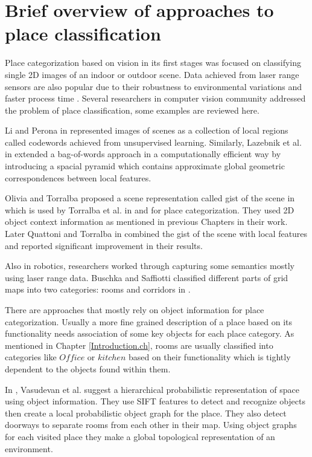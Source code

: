 \section{Brief overview of approaches to place classification}
\label{OverviewPlaceClassification.sec}
 Place categorization based on vision in its first stages was focused on classifying single 2D images of an indoor or 
 outdoor scene.
 Data achieved from laser range sensors are also popular due to their robustness to environmental variations and faster process time
 \cite{pronobis2011phd}.
 Several researchers in computer vision community addressed the problem of place classification, some examples are 
 reviewed here.
 
 Li and Perona in \cite{Li:2005:BHM:1068508.1069129} represented images of scenes as a collection of local regions 
 called codewords achieved from unsupervised learning. 
 Similarly, Lazebnik et al. in \cite{1641019} extended a bag-of-words approach in a computationally efficient way
 by introducing a spacial pyramid which contains approximate global geometric correspondences between local features.
  
 Olivia and Torralba proposed a scene representation called gist of the scene in \cite{oliva2006building} which is 
 used by Torralba et al. in \cite{TorralbaContextualPriming} and \cite{TrollbaContexBased} for place categorization.
 They used 2D object context information as mentioned in previous Chapters in their work.
 Later Quattoni and Torralba in \cite{quattoni2009recognizing} combined the gist of the scene with local features and 
 reported significant improvement in their results.
 
 Also in robotics, researchers worked through capturing some semantics mostly using laser range data.
 Buschka and Saffiotti classified different parts of grid maps into two categories: rooms and corridors in \cite{buschka2002virtual}. 
 
 There are approaches that mostly rely on object information for place categorization.
 Usually a more fine grained description of a place based on its functionality needs association of some key objects 
 for each place category.
 As mentioned in Chapter \ref{Introduction.ch}, rooms are usually classified into categories like $Office$ or 
 $kitchen$ based on their functionality which is tightly dependent to the objects found within them.
 
In \cite{Vasudevan2007359}, Vasudevan et al. suggest a hierarchical probabilistic representation of space using object
information. 
They use SIFT features to detect and recognize objects then create a local probabilistic object graph for the place. 
They also detect doorways to separate rooms from each other in their map. 
Using object graphs for each visited place they make a global topological representation of an environment.

